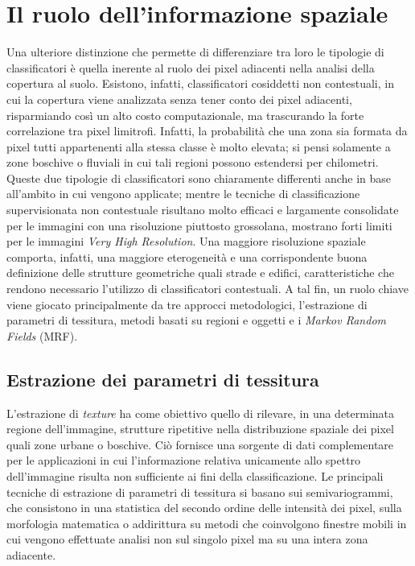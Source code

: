 \clearpage


\section{Il ruolo dell'informazione spaziale}

Una ulteriore distinzione che permette di differenziare tra loro le tipologie di classificatori è quella inerente al ruolo dei pixel adiacenti nella analisi della copertura al suolo. Esistono, infatti, classificatori cosiddetti non contestuali, in cui la copertura viene analizzata senza tener conto dei pixel adiacenti, risparmiando così un alto costo computazionale, ma trascurando la forte correlazione tra pixel limitrofi. Infatti, la probabilità che una zona sia formata da pixel tutti appartenenti alla stessa classe è molto elevata; si pensi solamente a zone boschive o fluviali in cui tali regioni possono estendersi per chilometri. 
\\

Queste due tipologie di classificatori sono chiaramente differenti anche in base all'ambito in cui vengono applicate; mentre le tecniche di classificazione supervisionata non contestuale risultano molto efficaci e largamente consolidate per le immagini con una risoluzione piuttosto grossolana, mostrano forti limiti per le immagini \emph{Very High Resolution}. 
Una maggiore risoluzione spaziale comporta, infatti, una maggiore eterogeneità e una corrispondente buona definizione delle strutture geometriche quali strade e edifici, caratteristiche che rendono necessario l'utilizzo di classificatori contestuali. 
A tal fin, un ruolo chiave viene giocato principalmente da tre approcci metodologici, l'estrazione di parametri di tessitura, metodi basati su regioni e oggetti e i \emph{Markov Random Fields} (MRF).


\subsection{Estrazione dei parametri di tessitura}
L'estrazione di \emph{texture} ha come obiettivo quello di rilevare, in una determinata regione dell'immagine, strutture ripetitive nella distribuzione spaziale dei pixel quali zone urbane o boschive. 
Ciò fornisce una sorgente di dati complementare per le applicazioni in cui l'informazione relativa unicamente allo spettro dell'immagine risulta non sufficiente ai fini della classificazione. 
Le principali tecniche di estrazione di parametri di tessitura si basano sui semivariogrammi, che consistono in una statistica del secondo ordine delle intensità dei pixel, sulla morfologia matematica o addirittura su metodi che coinvolgono finestre mobili in cui vengono effettuate analisi non sul singolo pixel ma su una intera zona adiacente. 


